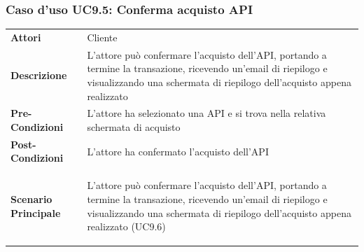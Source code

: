 \subsubsection{Caso d'uso UC9.5: Conferma acquisto API}
\label{UC9_5}

\begin{minipage}{\linewidth}
	\begin{tabular}{ l | p{11cm}}
		\hline
		\rowcolor{Gray}
		\multicolumn{2}{c}{UC9.5 - Conferma acquisto API} \\
		\hline
		\textbf{Attori} & Cliente \\
		\textbf{Descrizione} & L'attore può confermare l'acquisto dell'API, portando a termine la transazione, ricevendo un'email di riepilogo e visualizzando una schermata di riepilogo dell'acquisto appena realizzato \\
		\textbf{Pre-Condizioni} & L'attore ha selezionato una API e si trova nella relativa schermata di acquisto \\
		\textbf{Post-Condizioni} & L'attore ha confermato l'acquisto dell'API \\
		\textbf{Scenario Principale} & 
		\begin{enumerate*}[label=(\arabic*.),itemjoin={\newline}]
			\item L'attore può confermare l'acquisto dell'API, portando a termine la transazione, ricevendo un'email di riepilogo e visualizzando una schermata di riepilogo dell'acquisto appena realizzato (UC9.6)
		\end{enumerate*}\\
	\end{tabular}
\end{minipage}

\newpage
